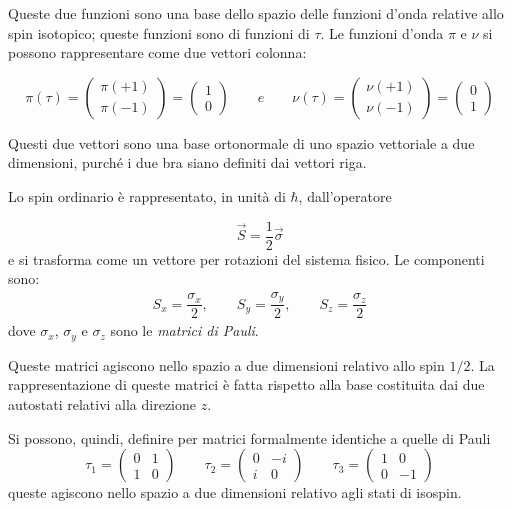 Queste due funzioni sono una base dello spazio delle funzioni d'onda relative
allo spin isotopico; queste funzioni sono di funzioni di $\tau$. Le funzioni
d'onda $\pi$ e $\nu$ si possono rappresentare come due vettori colonna:

\begin{equation*}
\pi(\tau) =
\begin{pmatrix}
\pi(+1) \\
\pi(-1)
\end{pmatrix} =
\begin{pmatrix}
1 \\
0
\end{pmatrix} 
\qquad e \qquad
\nu(\tau) = 
\begin{pmatrix}
\nu(+1) \\
\nu(-1)
\end{pmatrix} =
\begin{pmatrix}
0 \\
1
\end{pmatrix} 
\end{equation*}

Questi due vettori sono una base ortonormale di uno spazio vettoriale a due
dimensioni, purché i due bra siano definiti dai vettori riga.
\breaknote

Lo  spin ordinario è rappresentato, in unità di $\hbar$, dall'operatore

\begin{equation}
\vec{S}=\dfrac{1}{2} \vec{\sigma}
\end{equation}
e si trasforma come un vettore per rotazioni del sistema fisico. Le componenti sono:
\begin{align*}
  S_{x} = \dfrac{\sigma_{x}}{2}, \qquad S_{y} =\dfrac{\sigma_y}{2}, \qquad S_{z}=\dfrac{\sigma_z}{2}
\end{align*}
dove $\sigma_{x}$, $\sigma_{y}$ e $\sigma_{z}$ sono le \textit{matrici di Pauli}. 

Queste matrici agiscono nello spazio a due dimensioni relativo allo spin $1/2$.
La rappresentazione di queste matrici è fatta rispetto alla base costituita dai
due autostati relativi alla direzione $z$. 

Si possono, quindi, definire per matrici formalmente identiche a quelle di Pauli
\begin{equation*}
\tau_{1}=
\begin{pmatrix}
0 & 1 \\
1 & 0
\end{pmatrix}
\qquad
\tau_{2}=
\begin{pmatrix}
0 & -i \\
i & 0
\end{pmatrix}
\qquad
\tau_{3}=
\begin{pmatrix}
1 & 0 \\
0 & -1
\end{pmatrix}
\end{equation*}
queste agiscono nello spazio a due dimensioni relativo agli stati di isospin.

